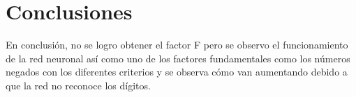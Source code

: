 \documentclass{article}
\begin{document}
 
\section{Conclusiones} 

En conclusión, no se logro obtener el factor F pero se observo el funcionamiento de la red neuronal así como uno de los factores fundamentales como los números negados con los diferentes criterios y se observa cómo van aumentando debido a que la red no reconoce los dígitos.




\end{document}
